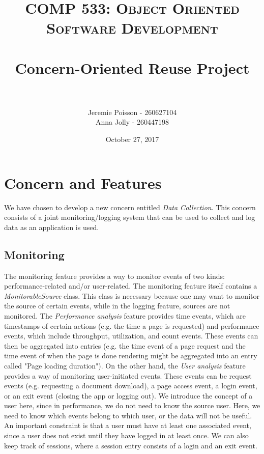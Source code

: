 \documentclass[paper=letter, fontsize=12pt]{scrartcl} %
\title{	
\normalfont \normalsize 
\textsc{COMP 533: Object Oriented Software Development} \\ [25pt] %
\horrule{0.5pt} \\[0.4cm] %
\huge Concern-Oriented Reuse Project \\ %
\horrule{2pt} \\[0.5cm] %
}
\author{Jeremie Poisson - 260627104 \\ Anna Jolly - 260447198} %
\date{\normalsize October 27, 2017} %
\numberwithin{equation}{section} %
\numberwithin{figure}{section} %
\numberwithin{table}{section} %
\begin{document}
\maketitle %

\section{Concern and Features}

We have chosen to develop a new concern entitled \textit{Data Collection}. This concern consists of a joint monitoring/logging system that can be used to collect and log data as an application is used.

\subsection{Monitoring}
\hspace*{.5cm} The monitoring feature provides a way to monitor events of two kinds: performance-related and/or user-related. The monitoring feature itself contains a \textit{MonitorableSource} class. This class is necessary because one may want to monitor the source of certain events, while in the logging feature, sources are not monitored. The \textit{Performance analysis} feature provides time events, which are timestamps of certain actions (e.g. the time a page is requested) and performance events, which include throughput, utilization, and count events. These events can then be aggregated into entries (e.g. the time event of a page request and the time event of when the page is done rendering might be aggregated into an entry called "Page loading duration"). On the other hand, the \textit{User analysis} feature provides a way of monitoring user-initiated events. These events can be request events (e.g. requesting a document download), a page access event, a login event, or an exit event (closing the app or logging out). We introduce the concept of a user here, since in performance, we do not need to know the source user. Here, we need to know which events belong to which user, or the data will not be useful. An important constraint is that a user must have at least one associated event, since a user does not exist until they have logged in at least once. We can also keep track of sessions, where a session entry consists of a login and an exit event. \\
\end{document}
